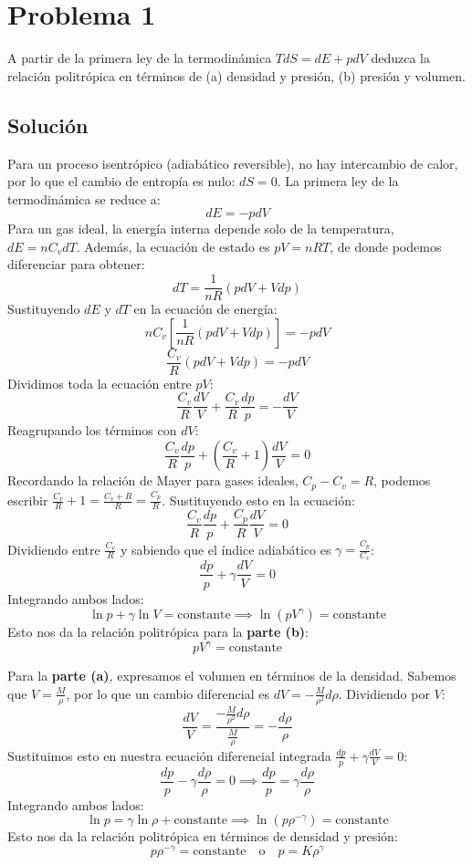 \documentclass[a4paper]{article}
\begin{document}
\tableofcontents

\section{Problema 1}

A partir de la primera ley de la termodinámica $T dS = dE + p dV$ deduzca la relación politrópica en términos de (a) densidad y presión, (b) presión y volumen.

\subsection{Solución}

Para un proceso isentrópico (adiabático reversible), no hay intercambio de calor, por lo que el cambio de entropía es nulo: $dS = 0$. La primera ley de la termodinámica se reduce a:
$$ dE = -p dV $$
Para un gas ideal, la energía interna depende solo de la temperatura, $dE = n C_v dT$. Además, la ecuación de estado es $pV = nRT$, de donde podemos diferenciar para obtener:
$$ dT = \frac{1}{nR} (p dV + V dp) $$
Sustituyendo $dE$ y $dT$ en la ecuación de energía:
$$ n C_v \left[ \frac{1}{nR} (p dV + V dp) \right] = -p dV $$
$$ \frac{C_v}{R} (p dV + V dp) = -p dV $$
Dividimos toda la ecuación entre $pV$:
$$ \frac{C_v}{R} \frac{dV}{V} + \frac{C_v}{R} \frac{dp}{p} = -\frac{dV}{V} $$
Reagrupando los términos con $dV$:
$$ \frac{C_v}{R} \frac{dp}{p} + \left( \frac{C_v}{R} + 1 \right) \frac{dV}{V} = 0 $$
Recordando la relación de Mayer para gases ideales, $C_p - C_v = R$, podemos escribir $\frac{C_v}{R} + 1 = \frac{C_v + R}{R} = \frac{C_p}{R}$. Sustituyendo esto en la ecuación:
$$ \frac{C_v}{R} \frac{dp}{p} + \frac{C_p}{R} \frac{dV}{V} = 0 $$
Dividiendo entre $\frac{C_v}{R}$ y sabiendo que el índice adiabático es $\gamma = \frac{C_p}{C_v}$:
$$ \frac{dp}{p} + \gamma \frac{dV}{V} = 0 $$
Integrando ambos lados:
$$ \ln p + \gamma \ln V = \text{constante} \implies \ln(p V^\gamma) = \text{constante} $$
Esto nos da la relación politrópica para la \textbf{parte (b)}:
$$ p V^\gamma = \text{constante} $$

Para la \textbf{parte (a)}, expresamos el volumen en términos de la densidad. Sabemos que $V = \frac{M}{\rho}$, por lo que un cambio diferencial es $dV = -\frac{M}{\rho^2} d\rho$. Dividiendo por $V$:
$$ \frac{dV}{V} = \frac{-\frac{M}{\rho^2} d\rho}{\frac{M}{\rho}} = -\frac{d\rho}{\rho} $$
Sustituimos esto en nuestra ecuación diferencial integrada $\frac{dp}{p} + \gamma \frac{dV}{V} = 0$:
$$ \frac{dp}{p} - \gamma \frac{d\rho}{\rho} = 0 \implies \frac{dp}{p} = \gamma \frac{d\rho}{\rho} $$
Integrando ambos lados:
$$ \ln p = \gamma \ln \rho + \text{constante} \implies \ln(p \rho^{-\gamma}) = \text{constante} $$
Esto nos da la relación politrópica en términos de densidad y presión:
$$ p \rho^{-\gamma} = \text{constante} \quad \text{o} \quad p = K \rho^\gamma $$
\end{document}
